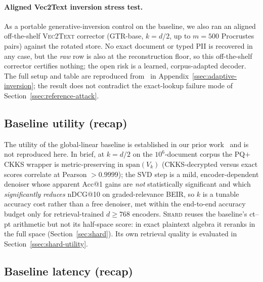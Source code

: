 \documentclass[11pt,a4paper]{article}
\begin{document}
\paragraph{Aligned Vec2Text inversion stress test.} As a portable
generative-inversion control on the baseline, we also ran an aligned
off-the-shelf \textsc{Vec2Text} corrector (GTR-base, $k=d/2$, up to
$m=500$ Procrustes pairs) against the rotated store. No exact document or
typed PII is recovered in any case, but the \emph{raw} row is also at the
reconstruction floor, so this off-the-shelf corrector certifies nothing;
the open risk is a learned, corpus-adapted decoder. The full setup and
table are reproduced from~\cite{ref_alpha} in
Appendix~\ref{ssec:adaptive-inversion}; the result does not contradict
the exact-lookup failure mode of Section~\ref{ssec:reference-attack}.

\subsection{Baseline utility (recap)}\label{ssec:projection-baselines}\label{ssec:integral}\label{ssec:significance}\label{ssec:beir}

The utility of the global-linear baseline is established in our prior
work~\cite{ref_vkit,ref_alpha} and is not reproduced here. In brief, at
$k=d/2$ on the $10^6$-document corpus the PQ$+$CKKS wrapper is
metric-preserving in $\mathrm{span}(V_k)$ (CKKS-decrypted versus exact
scores correlate at Pearson $>0.9999$); the SVD step is a mild,
encoder-dependent denoiser whose apparent Acc@1 gains are \emph{not}
statistically significant and which \emph{significantly reduces} nDCG@10 on
graded-relevance BEIR, so $k$ is a tunable accuracy cost rather than a free
denoiser, met within the end-to-end accuracy budget only for
retrieval-trained $d\geq768$ encoders. \textsc{Shard} reuses the baseline's
ct--pt arithmetic but not its half-space score: in exact plaintext algebra it
reranks in the full space (Section~\ref{sec:shard}). Its own retrieval quality
is evaluated in Section~\ref{ssec:shard-utility}.

\subsection{Baseline latency (recap)}\label{ssec:latency}
\end{document}
